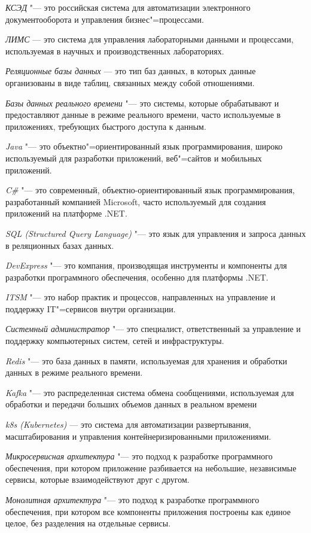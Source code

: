 \documentclass{article}
\begin{document}
\textit{КСЭД} "--- это российская система для автоматизации электронного документооборота и управления бизнес"=процессами.

\textit{ЛИМС} — это система для управления лабораторными данными и процессами, используемая в научных и производственных лабораториях.

\textit{Реляционные базы данных} — это тип баз данных, в которых данные организованы в виде таблиц, связанных между собой отношениями.

\textit{Базы данных реального времени} "--- это системы, которые обрабатывают и предоставляют данные в режиме реального времени, часто используемые в приложениях, требующих быстрого доступа к данным.

\textit{Java} "--- это объектно"=ориентированный язык программирования, широко используемый для разработки приложений, веб"=сайтов и мобильных приложений.

\textit{C\#} "--- это современный, объектно-ориентированный язык программирования, разработанный компанией Microsoft, часто используемый для создания приложений на платформе .NET.

\textit{SQL (Structured Query Language)} "--- это язык для управления и запроса данных в реляционных базах данных.

\textit{DevExpress} "--- это компания, производящая инструменты и компоненты для разработки программного обеспечения, особенно для платформы .NET.

\textit{ITSM} "--- это набор практик и процессов, направленных на управление и поддержку IT"=сервисов внутри организации.

\textit{Системный администратор} "--- это специалист, ответственный за управление и поддержку компьютерных систем, сетей и инфраструктуры.

\textit{Redis} "--- это база данных в памяти, используемая для хранения и обработки данных в режиме реального времени.

\textit{Kafka} "--- это распределенная система обмена сообщениями, используемая для обработки и передачи больших объемов данных в реальном времени

\textit{k8s (Kubernetes)} — это система для автоматизации развертывания, масштабирования и управления контейнеризированными приложениями.

\textit{Микросервисная архитектура} "--- это подход к разработке программного обеспечения, при котором приложение разбивается на небольшие, независимые сервисы, которые взаимодействуют друг с другом.

\textit{Монолитная архитектура} "--- это подход к разработке программного обеспечения, при котором все компоненты приложения построены как единое целое, без разделения на отдельные сервисы.
\end{document}
